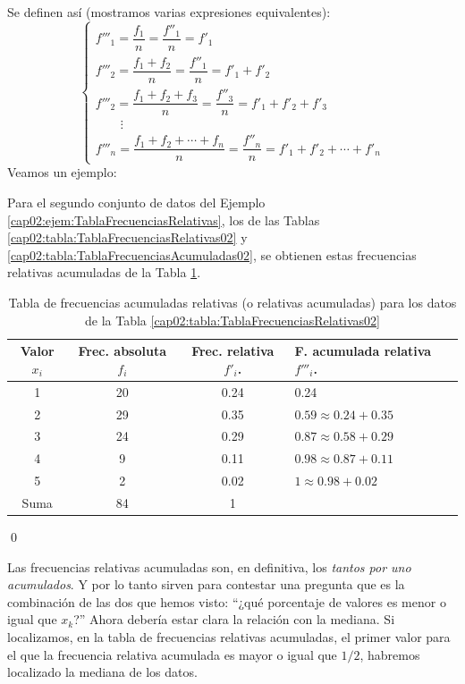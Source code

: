 Se definen así  (mostramos varias expresiones equivalentes):
\begin{equation}
\begin{cases}
f'''_1=\dfrac{f_1}{n}=\dfrac{f''_1}{n}=f'_1\\[3mm]
f'''_2=\dfrac{f_1+f_2}{n}=\dfrac{f''_1}{n}=f'_1+f'_2\\[3mm]
f'''_2=\dfrac{f_1+f_2+f_3}{n}=\dfrac{f''_3}{n}=f'_1+f'_2+f'_3\\[3mm]
\qquad\vdots\\
f'''_n=\dfrac{f_1+f_2+\cdots+f_n}{n}=\dfrac{f''_n}{n}=f'_1+f'_2+\cdots+f'_n
\end{cases}
\end{equation}
Veamos un ejemplo:

\begin{ejemplo}
\label{cap02:ejem:TablaFrecuenciasAcumuladasRelativas}
Para el segundo conjunto de datos del Ejemplo \ref{cap02:ejem:TablaFrecuenciasRelativas}, los de las Tablas \ref{cap02:tabla:TablaFrecuenciasRelativas02} y \ref{cap02:tabla:TablaFrecuenciasAcumuladas02}, se obtienen estas frecuencias relativas acumuladas de la Tabla \ref{cap02:tabla:TablaFrecuenciasAcumuladasRelativas}.

\begin{table}[ht]
\centering
\begin{tabular}{|c|c|c|l|}
  \hline
 Valor $x_i$& Frec. absoluta $f_i$ & Frec. relativa $f'_i$. & F. acumulada relativa $f'''_i$.\\
  \hline
  1 & 20 & 0.24 & 0.24 \\
  2 & 29 & 0.35 & $0.59\approx 0.24+0.35$ \\
  3 & 24 & 0.29 & $0.87\approx 0.58+0.29$ \\
  4 & 9 & 0.11 & $0.98\approx 0.87+0.11$ \\
  5 & 2 & 0.02 & $1\approx 0.98+0.02$ \\
  \hline
  Suma & 84 & 1 &\multicolumn{1}{c}{}\\
  \cline{1-3}
\end{tabular}
\caption{Tabla de frecuencias acumuladas relativas (o relativas acumuladas) para los datos de la Tabla \ref{cap02:tabla:TablaFrecuenciasRelativas02}}
\label{cap02:tabla:TablaFrecuenciasAcumuladasRelativas}
\end{table}
\qed
\end{ejemplo}

Las frecuencias relativas acumuladas son,  en definitiva, los {\em tantos por uno acumulados}. Y por lo tanto sirven para contestar una pregunta que es la combinación de las dos que hemos visto: ``¿qué porcentaje de valores es menor o igual que $x_k$?'' Ahora debería estar clara la relación con la mediana. Si localizamos, en la tabla de frecuencias relativas acumuladas, el primer valor para el que la frecuencia relativa acumulada es mayor o igual que $1/2$, habremos localizado la mediana de los datos.

